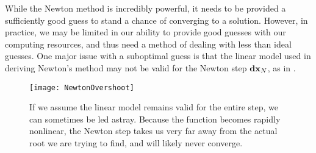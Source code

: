  While the Newton method is incredibly powerful, it needs to be provided a sufficiently good guess to stand a chance of converging to a solution. However, in practice, we may be limited in our ability to provide good guesses with our computing resources, and thus need a method of dealing with less than ideal guesses. One major issue with a suboptimal guess is that the linear model used in deriving Newton's method may not be valid for the Newton step $\mathbf{dx}_N$, as in . 
  \begin{figure}[h]
 \texttt{[image: NewtonOvershoot]}
 \caption{If we assume the linear model remains valid for the entire step, we can sometimes be led astray. Because the function becomes rapidly nonlinear, the Newton step takes us very far away from the actual root we are trying to find, and will likely never converge.}\label{fig:NewtonOvershoot}
 \end{figure}
 
